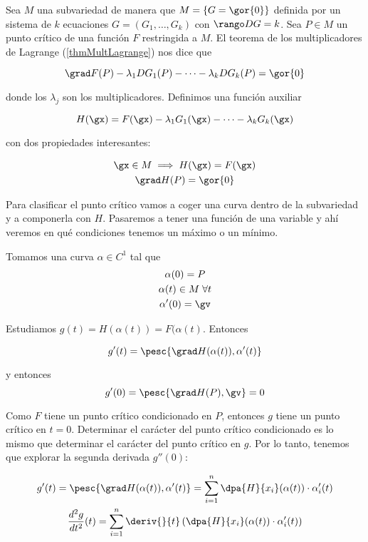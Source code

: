 Sea $M$ una subvariedad de manera que $M=\{G = \gor{0}\}$ definida por un sistema de $k$ ecuaciones $G=(G_1,\dotsc,G_k)$ con $\rango DG = k$. Sea $P\in M$ un punto crítico de una función $F$ restringida a $M$. El teorema de los multiplicadores de Lagrange (\ref{thmMultLagrange}) nos dice que 

\[ \grad F(P) - \lambda_1 DG_1(P) - \dotsb -\lambda_kDG_k(P) = \gor{0} \]

donde los $\lambda_j$ son los multiplicadores. Definimos una función auxiliar 

\begin{equation} H(\gx) = F(\gx) - \lambda_1 G_1(\gx) - \dotsb - \lambda_k G_k(\gx)\label{eqClasAux} \end{equation}

con dos propiedades interesantes:

\begin{gather*}
\gx\in M\implies H(\gx) = F(\gx) \\
\grad H(P) = \gor{0} 
\end{gather*}

Para clasificar el punto crítico vamos a coger una curva dentro de la subvariedad y a componerla con $H$. Pasaremos a tener una función de una variable y ahí veremos en qué condiciones tenemos un máximo o un mínimo.

Tomamos una curva $\alpha\in C^1$ tal que 
\begin{gather*}
\alpha(0) = P \\
\alpha(t) \in M\; \forall t \\
\alpha'(0) = \gv
\end{gather*}

Estudiamos $g(t) = H(\alpha(t)) = F(\alpha(t)$. Entonces

\[ g'(t) = \pesc{\grad H(\alpha(t)),\alpha'(t)} \]

y entonces \[ g'(0) =\pesc{\grad H(P),\gv} = 0\]

Como $F$ tiene un punto crítico condicionado en $P$, entonces $g$ tiene un punto crítico en $t = 0$. Determinar el carácter del punto crítico condicionado es lo mismo que determinar el carácter del punto crítico en $g$. Por lo tanto, tenemos que explorar la segunda derivada $g''(0)$:

\begin{gather*}
g'(t) = \pesc{\grad H(\alpha(t)),\alpha'(t)}  = \sum_{i=1}^n\dpa{H}{x_i}(\alpha(t)) \cdot \alpha_i'(t) \\
\frac{d^2g}{dt^2}(t) =  \sum_{i=1}^n\deriv{}{t} \left(\dpa{H}{x_i}(\alpha(t)) \cdot \alpha_i'(t)\right)
\end{gather*}

